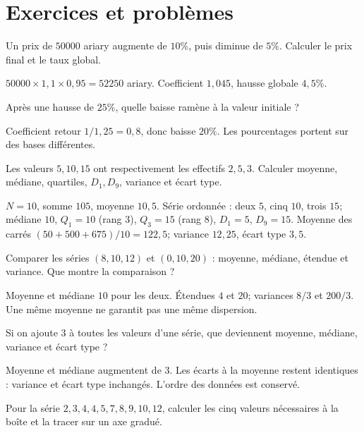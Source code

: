 \section{Exercices et problèmes}
\label{t11s-c18-e01}
Un prix de $50000$ ariary augmente de $10\%$, puis diminue de $5\%$. Calculer le prix final et le taux global.
\begin{corrige}\label{sol-t11s-c18-e01}
$50000\times1{,}1\times0{,}95=52250$ ariary. Coefficient $1{,}045$, hausse globale $4{,}5\%$.
\end{corrige}
\label{t11s-c18-e02}
Après une hausse de $25\%$, quelle baisse ramène à la valeur initiale ?
\begin{corrige}\label{sol-t11s-c18-e02}
Coefficient retour $1/1{,}25=0{,}8$, donc baisse $20\%$. Les pourcentages portent sur des bases différentes.
\end{corrige}
\exo[Effectifs]\label{t11s-c18-e03}
Les valeurs $5,10,15$ ont respectivement les effectifs $2,5,3$. Calculer moyenne, médiane, quartiles, $D_1,D_9$, variance et écart type.
\begin{corrige}\label{sol-t11s-c18-e03}
$N=10$, somme $105$, moyenne $10{,}5$. Série ordonnée : deux $5$, cinq $10$, trois $15$; médiane $10$, $Q_1=10$ (rang $3$), $Q_3=15$ (rang $8$), $D_1=5$, $D_9=15$. Moyenne des carrés $(50+500+675)/10=122{,}5$; variance $12{,}25$, écart type $3{,}5$.
\end{corrige}
\label{t11s-c18-e04}
Comparer les séries $(8,10,12)$ et $(0,10,20)$ : moyenne, médiane, étendue et variance. Que montre la comparaison ?
\begin{corrige}\label{sol-t11s-c18-e04}
Moyenne et médiane $10$ pour les deux. Étendues $4$ et $20$; variances $8/3$ et $200/3$. Une même moyenne ne garantit pas une même dispersion.
\end{corrige}
\exo[Décalage]\label{t11s-c18-e05}
Si on ajoute $3$ à toutes les valeurs d’une série, que deviennent moyenne, médiane, variance et écart type ?
\begin{corrige}\label{sol-t11s-c18-e05}
Moyenne et médiane augmentent de $3$. Les écarts à la moyenne restent identiques : variance et écart type inchangés. L’ordre des données est conservé.
\end{corrige}
\label{t11s-c18-e06}
Pour la série $2,3,4,4,5,7,8,9,10,12$, calculer les cinq valeurs nécessaires à la boîte et la tracer sur un axe gradué.
